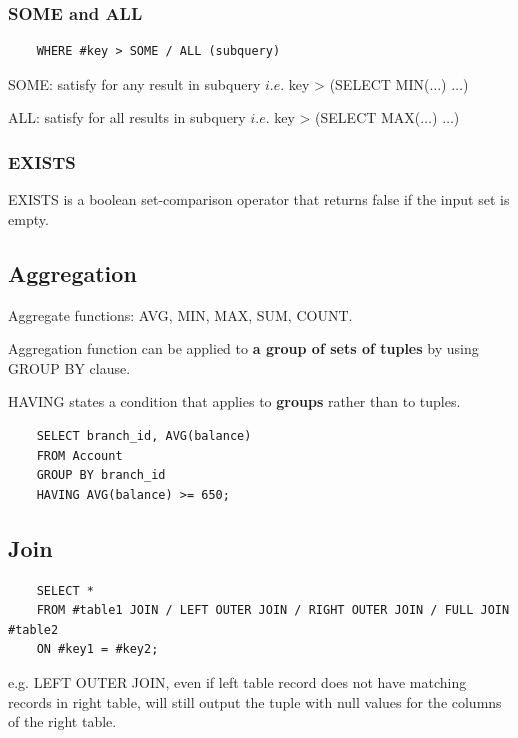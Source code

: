 \documentclass[11pt,a4paper]{article}
\begin{document}
\subsubsection{SOME and ALL}
\begin{lstlisting}
    WHERE #key > SOME / ALL (subquery)
\end{lstlisting}
SOME: satisfy for any result in subquery $i.e.$ key > (SELECT MIN($\dots$) $\dots$) \par
ALL: satisfy for all results in subquery $i.e.$ key > (SELECT MAX($\dots$) $\dots$) \par
{}

\subsubsection{EXISTS}
EXISTS is a boolean set-comparison operator that returns false if the input set is empty.

\subsection{Aggregation}
Aggregate functions: AVG, MIN, MAX, SUM, COUNT. \par
Aggregation function can be applied to \textbf{a group of sets of tuples} by using GROUP BY clause. \par
HAVING states a condition that applies to \textbf{groups} rather than to tuples. \par
{}

\begin{lstlisting}
    SELECT branch_id, AVG(balance)
    FROM Account
    GROUP BY branch_id
    HAVING AVG(balance) >= 650;
\end{lstlisting}

\subsection{Join}
\begin{lstlisting}
    SELECT *
    FROM #table1 JOIN / LEFT OUTER JOIN / RIGHT OUTER JOIN / FULL JOIN #table2
    ON #key1 = #key2;
\end{lstlisting}
e.g. LEFT OUTER JOIN, even if left table record does not have matching records in right table, will still output the tuple with null values for the columns of the right table.
\end{document}
